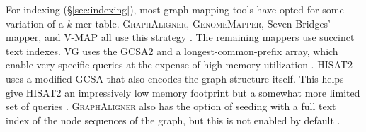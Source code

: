 For indexing (\S \ref{sec:indexing}), most graph mapping tools have opted for some variation of a $k$-mer table. 
\textsc{GraphAligner}, \textsc{GenomeMapper}, Seven Bridges' mapper, and \textsc{V-MAP} all use this strategy \cite{Rautiainen_2019b, Schneeberger_2009, Rakocevic_2019, Vaddadi_2019}. 
The remaining mappers use succinct text indexes.
\textsc{VG} uses the GCSA2 \cite{Siren_2017} and a longest-common-prefix array, which enable very specific queries at the expense of high memory utilization \cite{Garrison_2019}.
\textsc{HISAT2} uses a modified GCSA \cite{Siren_2014} that also encodes the graph structure itself.
This helps give \textsc{HISAT2} an impressively low memory footprint but a somewhat more limited set of queries \cite{Kim_2019}.
\textsc{GraphAligner} also has the option of seeding with a full text index of the node sequences of the graph, but this is not enabled by default \cite{Rautiainen_2019b}.



